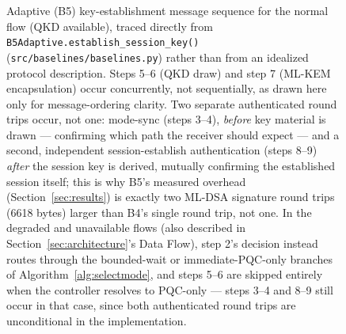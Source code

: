 \documentclass[journal]{IEEEtran}
\begin{document}
\begin{figure}[t]
\caption{Adaptive (B5) key-establishment message sequence for the normal flow (QKD available), traced directly from \texttt{B5Adaptive.establish\_session\_key()} (\texttt{src/baselines/baselines.py}) rather than from an idealized protocol description. Steps 5--6 (QKD draw) and step 7 (ML-KEM encapsulation) occur concurrently, not sequentially, as drawn here only for message-ordering clarity. Two separate authenticated round trips occur, not one: mode-sync (steps 3--4), \emph{before} key material is drawn --- confirming which path the receiver should expect --- and a second, independent session-establish authentication (steps 8--9) \emph{after} the session key is derived, mutually confirming the established session itself; this is why B5's measured overhead (Section~\ref{sec:results}) is exactly two ML-DSA signature round trips (\num{6618} bytes) larger than B4's single round trip, not one. In the degraded and unavailable flows (also described in Section~\ref{sec:architecture}'s Data Flow), step 2's decision instead routes through the bounded-wait or immediate-PQC-only branches of Algorithm~\ref{alg:selectmode}, and steps 5--6 are skipped entirely when the controller resolves to PQC-only --- steps 3--4 and 8--9 still occur in that case, since both authenticated round trips are unconditional in the implementation.}
\label{fig:sequence}
\end{figure}
\end{document}
